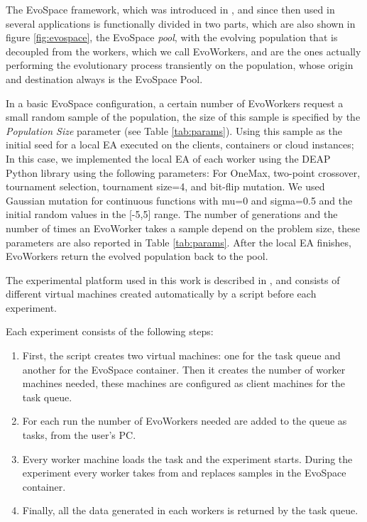 \documentclass[conference]{IEEEtran}
\begin{document}
The EvoSpace framework, which was introduced in \cite{Evospace}, and
since then used in several applications
\cite{GValdez2015,garcia2017evospace}  is functionally divided in two
parts, which are also shown in figure \ref{fig:evospace}, the EvoSpace {\em pool}, 
with the evolving population that is decoupled from the workers, which we call EvoWorkers,
 and are the ones actually performing the evolutionary process transiently on the population,
  whose origin and destination always is the EvoSpace Pool.

In a basic EvoSpace configuration, a certain number of EvoWorkers request a small random sample of the
population, the size of this sample is specified by the {\em Population Size} parameter (see Table \ref{tab:params}).
Using this sample as the initial seed for a local EA executed
on the clients, containers or cloud instances;  In this case, we implemented the 
local EA of each worker using the DEAP Python
library \cite{fortin2012deap} using the following parameters: For OneMax, two-point crossover,
tournament selection, tournament size=4, and bit-flip mutation.  We used
Gaussian mutation for continuous functions with mu=0 and sigma=0.5 and the
initial random values in the [-5,5] range. The number of generations and 
the number of times an EvoWorker takes a sample depend on the problem size,
these parameters are also reported in Table \ref{tab:params}. After the 
local EA finishes, EvoWorkers return the evolved population back to the pool. 

The experimental platform used in this work is
described in \cite{valenzuela2015implementing}, and consists of different virtual machines
created automatically by a script before each experiment.

Each experiment consists of the following steps:

\begin{enumerate}
    \item First, the script creates two virtual machines: one for the task queue and another
    for the EvoSpace container. Then it creates the number of worker machines needed, these
    machines are configured as client machines for the task queue.
    \item For each run the number of EvoWorkers needed are added to the queue as tasks, from
    the user's PC.
    \item Every worker machine loads the task and the experiment
      starts. During the experiment every worker takes from and replaces
      samples in the EvoSpace container.
    \item Finally, all the data generated in each workers is returned by the task queue.
    \end{enumerate}
\end{document}
